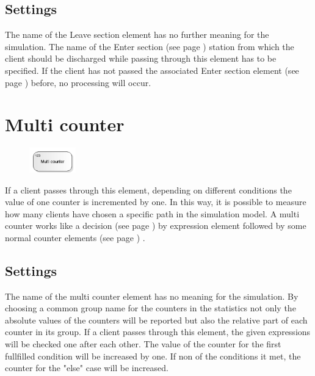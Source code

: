 \subsection*{Settings}

The name of the Leave section element has no further meaning for the simulation.
The name of the Enter section (see page \pageref{ref:ModelElementSectionStart}) station
from which the client should be discharged while passing through this element has
to be specified. If the client has not passed the associated
Enter section element (see page \pageref{ref:ModelElementSectionStart}) before,
no processing will occur.


\section{Multi counter}
\label{ref:ModelElementCounterMulti}

\begin{figure}
\vspace{-22pt}
\includegraphics[width=2cm]{imageModelElementCounterMulti.png}
\vspace{-22pt}
\end{figure}

If a client passes through this element, depending on different conditions the value
of one counter is incremented by one. In this way, it is possible to measure how many
clients have chosen a specific path in the simulation model. A multi counter works
like a decision (see page \pageref{ref:ModelElementDecide}) by expression element followed
by some normal counter elements (see page \pageref{ref:ModelElementCounter}) .

\subsection*{Settings}

The name of the multi counter element has no meaning for the simulation. By choosing
a common group name for the counters in the statistics not only the absolute values
of the counters will be reported but also the relative part of each counter in its
group. If a client passes through this element, the given expressions will be checked
one after each other. The value of the counter for the first fullfilled condition will
be increased by one. If non of the conditions it met, the counter for the "else" case
will be increased.


